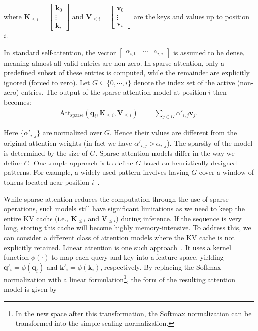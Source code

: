 \noindent where $\mathbf{K}_{\le i} = \begin{bmatrix} \mathbf{k}_0 \\ \vdots \\ \mathbf{k}_{i} \end{bmatrix}$ and $\mathbf{V}_{\le i} = \begin{bmatrix} \mathbf{v}_0 \\ \vdots \\ \mathbf{v}_{i} \end{bmatrix}$ are the keys and values up to position $i$.

In standard self-attention, the vector $\begin{bmatrix} \alpha_{i,0} & \cdots & \alpha_{i,i} \end{bmatrix}$ is assumed to be dense, meaning almost all valid entries are non-zero. In sparse attention, only a predefined subset of these entries is computed, while the remainder are explicitly ignored (forced to zero). Let $G \subseteq \{0,\cdots,i\}$ denote the index set of the active (non-zero) entries. The output of the sparse attention model at position $i$ then becomes:
\begin{eqnarray}
\mathrm{Att}_{\mathrm{sparse}}(\mathbf{q}_i,\mathbf{K}_{\le i},\mathbf{V}_{\le i}) & = & \sum_{j \in G} \alpha'_{i,j} \mathbf{v}_{j}.
\end{eqnarray}

\noindent Here $\{\alpha'_{i,j}\}$ are normalized over $G$. Hence their values are different from the original attention weights (in fact we have $\alpha'_{i,j} > \alpha_{i,j}$). The sparsity of the model is determined by the size of $G$. Sparse attention models differ in the way we define $G$. One simple approach is to define $G$ based on heuristically designed patterns. For example, a widely-used pattern involves having $G$ cover a window of tokens located near position $i$~\cite{parmar-etal:2018image}.

While sparse attention reduces the computation through the use of sparse operations, such models still have significant limitations as we need to keep the entire KV cache (i.e., $\mathbf{K}_{\le i}$ and $\mathbf{V}_{\le i}$) during inference. If the sequence is very long, storing this cache will become highly memory-intensive. To address this, we can consider a different class of attention models where the KV cache is not explicitly retained. Linear attention is one such approach~\cite{katharopoulos-etal:2020transformers}. It uses a kernel function $\phi(\cdot)$ to map each query and key into a feature space, yielding $\mathbf{q}'_i = \phi(\mathbf{q}_i)$ and $\mathbf{k}'_i = \phi(\mathbf{k}_i)$, respectively. By replacing the Softmax normalization with a linear formulation\footnote{In the new space after this transformation, the Softmax normalization can be transformed into the simple scaling normalization.}, the form of the resulting attention model is given by

